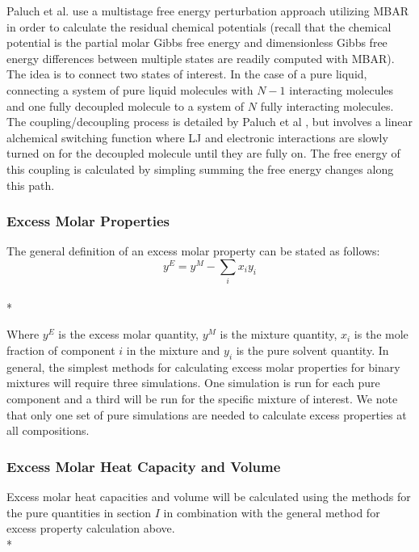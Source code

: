 \documentclass[aps,pre,twocolumn,nofootinbib,superscriptaddress,linenumbers,10pt, draft,tightenlines]{revtex4-1}
\begin{document}
Paluch et al. use a multistage free energy perturbation approach utilizing MBAR in order to calculate the residual chemical potentials (recall that the chemical potential is the partial molar Gibbs free energy and dimensionless Gibbs free energy differences between multiple states are readily computed with MBAR). The idea is to connect two states of interest. In the case of a pure liquid, connecting a system of pure liquid molecules with $N - 1$ interacting molecules and one fully decoupled molecule to a system of $N$ fully interacting molecules. The coupling/decoupling process is detailed by Paluch et al \cite{paluch0}, but involves a linear alchemical switching function where LJ and electronic interactions are slowly turned on for the decoupled molecule until they are fully on. The free energy of this coupling is calculated by simpling summing the free energy changes along this path.     


\subsubsection{Excess Molar Properties}
The general definition of an excess molar property can be stated as follows:
\begin{equation}y^{E} = y^{M} - \sum_{i} x_i y_i\end{equation}\\*

Where $y^E$ is the excess molar quantity, $y^M$ is the mixture quantity, $x_i$ is the mole fraction of component $i$ in the mixture and $y_i$ is the pure solvent quantity. In general, the simplest methods for calculating excess molar properties for binary mixtures will require three simulations. One simulation is run for each pure component and a third will be run for the specific mixture of interest.
We note that only one set of pure simulations are needed to calculate excess properties at all compositions.


\subsubsection{Excess Molar Heat Capacity and Volume}
Excess molar heat capacities and volume will be calculated using the  methods for the pure quantities in section $I$ in combination with the general method for excess property calculation above.\\*
\end{document}
